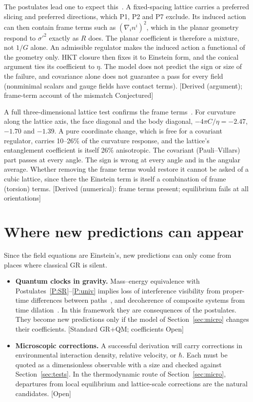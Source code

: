 \documentclass[11pt]{article}
\newcommand{\st}[1]{\textsf{\small[#1]}}
\theoremstyle{plain}
\theoremstyle{definition}
\theoremstyle{remark}
\begin{document}
The postulates lead one to expect this~\cite{JordanNote9}. A fixed-spacing lattice carries a preferred slicing and preferred directions, which P1, P2 and P7 exclude. Its induced action can then contain frame terms such as $(\nabla_i n^i)^2$, which in the planar geometry respond to $\sigma'^2$ exactly as $R$ does. The planar coefficient is therefore a mixture, not $1/G$ alone. An admissible regulator makes the induced action a functional of the geometry only. HKT closure then fixes it to Einstein form, and the conical argument ties its coefficient to $\eta$. The model does not predict the sign or size of the failure, and covariance alone does not guarantee a pass for every field (nonminimal scalars and gauge fields have contact terms). \st{Derived (argument); frame-term account of the mismatch Conjectured}

A full three-dimensional lattice test confirms the frame terms~\cite{JordanNote10}. For curvature along the lattice axis, the face diagonal and the body diagonal, $-4\pi C/\eta=-2.47$, $-1.70$ and $-1.39$. A pure coordinate change, which is free for a covariant regulator, carries 10--26\% of the curvature response, and the lattice's entanglement coefficient is itself 26\% anisotropic. The covariant (Pauli--Villars) part passes at every angle. The sign is wrong at every angle and in the angular average. Whether removing the frame terms would restore it cannot be asked of a cubic lattice, since there the Einstein term is itself a combination of frame (torsion) terms. \st{Derived (numerical): frame terms present; equilibrium fails at all orientations}

\section{Where new predictions can appear}
\label{sec:predictions}

Since the field equations are Einstein's, new predictions can only come from places where classical GR is silent.

\begin{itemize}
\item \textbf{Quantum clocks in gravity.} Mass--energy equivalence with Postulates~\ref{P:SR}--\ref{P:univ} implies loss of interference visibility from proper-time differences between paths~\cite{Zych2011}, and decoherence of composite systems from time dilation~\cite{Pikovski2015}. In this framework they are consequences of the postulates. They become new predictions only if the model of Section~\ref{sec:micro} changes their coefficients. \st{Standard GR+QM; coefficients Open}
\item \textbf{Microscopic corrections.} A successful derivation will carry corrections in environmental interaction density, relative velocity, or $\hbar$. Each must be quoted as a dimensionless observable with a size and checked against Section~\ref{sec:tests}. In the thermodynamic route of Section~\ref{sec:micro}, departures from local equilibrium and lattice-scale corrections are the natural candidates. \st{Open}
\end{itemize}
\end{document}
